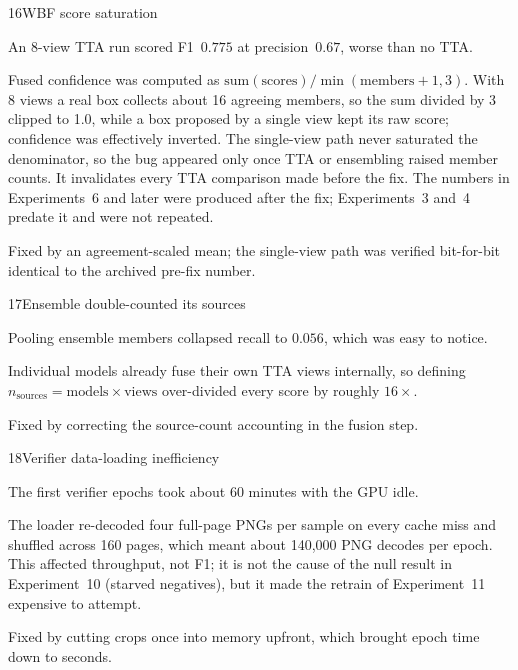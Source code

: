 \begin{explog}{16}{WBF score saturation}
\item[Discovery] An 8-view TTA run scored F1~$0.775$ at precision~$0.67$, worse than no TTA.
\item[Cause] Fused confidence was computed as $\mathrm{sum(scores)}/\min(\mathrm{members}{+}1,3)$. With 8 views a real box collects about 16 agreeing members, so the sum divided by 3 clipped to 1.0, while a box proposed by a single view kept its raw score; confidence was effectively inverted. The single-view path never saturated the denominator, so the bug appeared only once TTA or ensembling raised member counts. It invalidates every TTA comparison made before the fix. The numbers in Experiments~6 and later were produced after the fix; Experiments~3 and~4 predate it and were not repeated.
\item[Fix] Fixed by an agreement-scaled mean; the single-view path was verified bit-for-bit identical to the archived pre-fix number.
\end{explog}


\begin{explog}{17}{Ensemble double-counted its sources}
\item[Discovery] Pooling ensemble members collapsed recall to $0.056$, which was easy to notice.
\item[Cause] Individual models already fuse their own TTA views internally, so defining $n_{\mathrm{sources}} = \mathrm{models}\times\mathrm{views}$ over-divided every score by roughly $16\times$.
\item[Fix] Fixed by correcting the source-count accounting in the fusion step.
\end{explog}


\begin{explog}{18}{Verifier data-loading inefficiency}
\item[Discovery] The first verifier epochs took about 60 minutes with the GPU idle.
\item[Cause] The loader re-decoded four full-page PNGs per sample on every cache miss and shuffled across 160 pages, which meant about 140{,}000 PNG decodes per epoch. This affected throughput, not F1; it is not the cause of the null result in Experiment~10 (starved negatives), but it made the retrain of Experiment~11 expensive to attempt.
\item[Fix] Fixed by cutting crops once into memory upfront, which brought epoch time down to seconds.
\end{explog}



